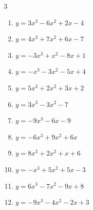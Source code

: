 \begin{multicols}{3}
\begin{enumerate}

  \item $y=3x^{3}-6x^{2}+2x-4$


  \item $y=4x^{3}+7x^{2}+6x-7$


  \item $y=-3x^{3}+x^{2}-8x+1$


  \item $y=-x^{3}-3x^{2}-5x+4$


  \item $y=5x^{3}+2x^{2}+3x+2$


  \item $y=3x^{3}-3x^{2}-7$


  \item $y=-9x^{3}-6x-9$


  \item $y=-6x^{3}+9x^{2}+6x$


\columnbreak %

\resetques

  \item $y=8x^{3}+2x^{2}+x+6$


  \item $y=-x^{3}+5x^{2}+5x-3$


  \item $y=6x^{3}-7x^{2}-9x+8$


  \item $y=-9x^{3}-4x^{2}-2x+3$


\end{enumerate}
\end{multicols}

